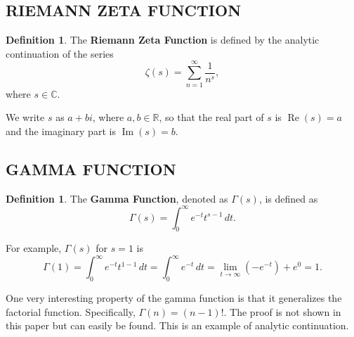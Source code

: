 \documentclass[12pt]{amsart} %
\theoremstyle{definition}
\newtheorem{definition}[thm]{Definition}
\theoremstyle{remark}
\numberwithin{equation}{section}
\begin{document}
\subsection{RIEMANN ZETA FUNCTION}
\begin{definition}
The \textbf{Riemann Zeta Function} is defined by the analytic continuation of the series
$$\zeta(s) = \sum_{n=1}^\infty \frac{1}{n^s},$$
where $s \in \mathbb{C}.$

We write $s$ as $a + bi$, where $a, b \in \mathbb{R}$, so that the real part of $s$ is $\operatorname{Re}(s) = a$ and the imaginary part is $\operatorname{Im}(s) = b$.
\end{definition}

\subsection{GAMMA FUNCTION}
\begin{definition}
The \textbf{Gamma Function}, denoted as $\Gamma(s)$, is defined as
$$\Gamma(s) = \int_{0}^\infty e^{-t}t^{s-1} \, dt.$$

For example, $\Gamma(s)$ for $s = 1$ is
$$\Gamma(1) = \int_{0}^\infty e^{-t}t^{1-1} \, dt = \int_{0}^\infty e^{-t} \, dt = \lim_{t \to \infty} (-e^{-t}) + e^0 = 1.$$

One very interesting property of the gamma function is that it generalizes the factorial function. Specifically, $\Gamma(n) = (n-1)!$. The proof is not shown in this paper but can easily be found. This is an example of analytic continuation.
\end{definition}
\end{document}
